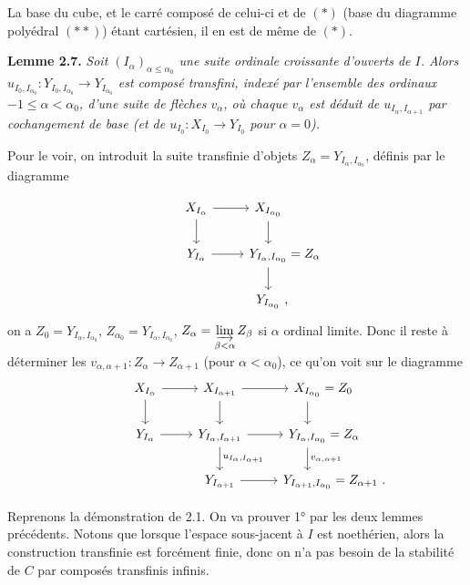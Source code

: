 \documentclass[11pt]{article}
\newcommand{\printedpage}[1]{\marginpar{\footnotesize p.~#1\ifstrequal{#1}{1}{\\[2pt]{[page 1]}}{}}}
\newcommand{\msp}[1]{\ifstrequal{#1}{page 1}{}{\marginpar{\footnotesize [#1]}}}
\begin{document}
La base du cube, et le carré
\msp{page 33}
composé de celui-ci et de $(*)$ (base du diagramme polyédral $(**)$) étant cartésien, il en est de même de $(*)$.

\textbf{Lemme 2.7.} \textit{Soit $(I_\alpha)_{\alpha\leq\alpha_0}$ une suite ordinale croissante d'ouverts de $I$. Alors $u_{I_0,I_{\alpha_0}} : Y_{I_0,I_{\alpha_0}} \longrightarrow Y_{I_{\alpha_0}}$ est composé transfini, indexé par l'ensemble des ordinaux $-1 \leq \alpha < \alpha_0$, d'une suite de flèches $v_\alpha$, où chaque $v_\alpha$ est déduit de $u_{I_\alpha,I_{\alpha+1}}$ par cochangement de base (et de $u_{I_0} : X_{I_0} \longrightarrow Y_{I_0}$ pour $\alpha = 0$).}

Pour le voir, on introduit la suite transfinie d'objets $Z_\alpha = Y_{I_\alpha,I_{\alpha_0}}$, définis par le diagramme

\printedpage{19}

\[
\begin{tikzcd}
X_{I_\alpha} \arrow[r] \arrow[d] & X_{I_{\alpha_0}} \arrow[d] \\
Y_{I_\alpha} \arrow[r] & Y_{I_\alpha,I_{\alpha_0}} \rlap{${}= Z_\alpha$} \arrow[d] \\
& Y_{I_{\alpha_0}} \rlap{\ ,}
\end{tikzcd}
\]
on a $Z_0 = Y_{I_\alpha,I_{\alpha_0}}$, $Z_{\alpha_0} = Y_{I_\alpha,I_{\alpha_0}}$, $Z_\alpha = \varinjlim\limits_{\beta<\alpha} Z_\beta$ si $\alpha$ \msp{34} ordinal limite. Donc il reste à déterminer les $v_{\alpha,\alpha+1} : Z_\alpha \longrightarrow Z_{\alpha+1}$ (pour $\alpha < \alpha_0$), ce qu'on voit sur le diagramme
\[
\begin{tikzcd}
X_{I_\alpha} \arrow[r] \arrow[d] & X_{I_{\alpha+1}} \arrow[r] \arrow[d] & X_{I_{\alpha_0}} \rlap{${}= Z_0$} \arrow[d] \\
Y_{I_\alpha} \arrow[r] & Y_{I_\alpha,I_{\alpha+1}} \arrow[r] \arrow[d, "u_{I_\alpha,I_{\alpha+1}}"] & Y_{I_\alpha,I_{\alpha_0}} \rlap{${}= Z_\alpha$} \arrow[d, "v_{\alpha,\alpha+1}"] \\
& Y_{I_{\alpha+1}} \arrow[r] & Y_{I_{\alpha+1},I_{\alpha_0}} \rlap{${}= Z_{\alpha+1}\ .$}
\end{tikzcd}
\]

Reprenons la démonstration de 2.1. On va prouver 1° par les deux lemmes précédents. Notons que lorsque l'espace sous-jacent à $I$ est noethérien, alors la construction transfinie est forcément finie, donc on n'a pas besoin de la stabilité de $C$ par composés transfinis infinis.
\end{document}
